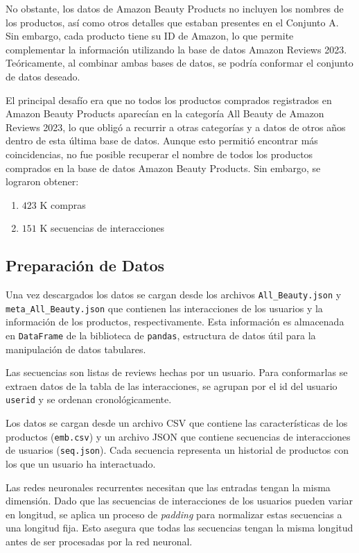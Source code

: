 \documentclass[runningheads]{llncs}
\begin{document}
No obstante, los datos de Amazon Beauty Products no incluyen los nombres de los productos, así como otros detalles que estaban presentes en el Conjunto A. Sin embargo, cada producto tiene su ID de Amazon, lo que permite complementar la información utilizando la base de datos Amazon Reviews 2023. Teóricamente, al combinar ambas bases de datos, se podría conformar el conjunto de datos deseado.

El principal desafío era que no todos los productos comprados registrados en Amazon Beauty Products aparecían en la categoría All Beauty de Amazon Reviews 2023, lo que obligó a recurrir a otras categorías y a datos de otros años dentro de esta última base de datos. Aunque esto permitió encontrar más coincidencias, no fue posible recuperar el nombre de todos los productos comprados en la base de datos Amazon Beauty Products. Sin embargo, se lograron obtener:
\begin{enumerate}
	\item $423$ K compras
	\item $151$ K secuencias de interacciones
\end{enumerate}

\subsection{Preparación de Datos}

Una vez descargados los datos se cargan desde los archivos \texttt{All\_Beauty.json} y \texttt{meta\_All\_Beauty.json} que contienen las interacciones de los usuarios y la información de los productos, respectivamente. Esta información es almacenada en \texttt{DataFrame} de la biblioteca de \texttt{pandas}, estructura de datos \'util para la manipulaci\'on de datos tabulares.

Las secuencias son listas de reviews hechas por un usuario. Para conformarlas se extraen datos de la tabla de las interacciones, se agrupan por el id del usuario \texttt{userid} y se ordenan cronol\'ogicamente.

Los datos se cargan desde un archivo CSV que contiene las características de los productos (\texttt{emb.csv}) y un archivo JSON que contiene secuencias de interacciones de usuarios (\texttt{seq.json}). Cada secuencia representa un historial de productos con los que un usuario ha interactuado. 

Las redes neuronales recurrentes necesitan que las entradas tengan la misma dimensión. Dado que las secuencias de interacciones de los usuarios pueden variar en longitud, se aplica un proceso de \textit{padding} para normalizar estas secuencias a una longitud fija. Esto asegura que todas las secuencias tengan la misma longitud antes de ser procesadas por la red neuronal. 
\end{document}
